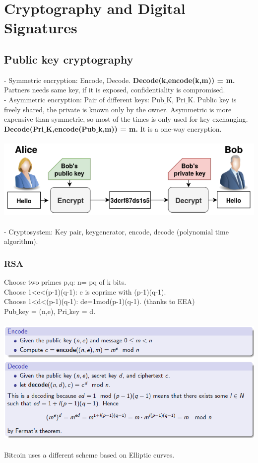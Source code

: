 \documentclass{article}
\begin{document}
\section{Cryptography and Digital Signatures}
\subsection{Public key cryptography}
- Symmetric encryption: Encode, Decode. \textbf{Decode(k,encode(k,m)) = m.}\\
Partners needs same key, if it is exposed, confidentiality is compromised.\\
- Asymmetric encryption: Pair of different keys: Pub$\_$K, Pri$\_$K. Public key is freely shared, the private is known only by the owner. Asymmetric is more expensive than symmetric, so most of the times is only used for key exchanging.\\
\textbf{Decode(Pri$\_$K,encode(Pub$\_$k,m)) = m.} It is a one-way encryption.\\\\
\includegraphics[scale=0.8]{3.png}\\\\
- Cryptosystem: Key pair, keygenerator, encode, decode (polynomial time algorithm).\\

\subsubsection{RSA}
Choose two primes p,q: n= pq of k bits.\\
Choose 1<e<(p-1)(q-1): e is coprime with (p-1)(q-1).\\
Choose 1<d<(p-1)(q-1): de=1mod(p-1)(q-1). (thanks to EEA)\\
Pub$\_$key = (n,e), Pri$\_$key = d.\\\\
\includegraphics[scale=0.8]{4.png}\\\\
Bitcoin uses a different scheme based on Elliptic curves.\\
\end{document}
